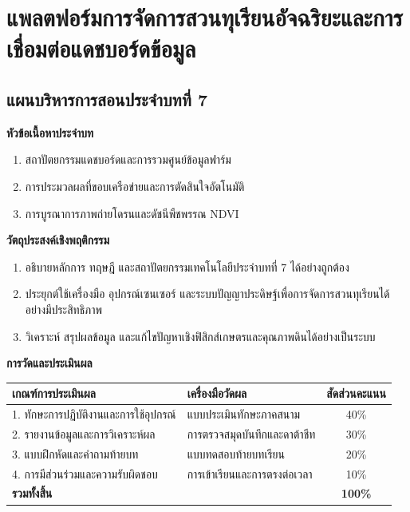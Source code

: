 \chapter{แพลตฟอร์มการจัดการสวนทุเรียนอัจฉริยะและการเชื่อมต่อแดชบอร์ดข้อมูล}
\label{chap:ch07}

\section*{แผนบริหารการสอนประจำบทที่ 7}

\noindent\textbf{หัวข้อเนื้อหาประจำบท}
\begin{enumerate}
    \item สถาปัตยกรรมแดชบอร์ดและการรวมศูนย์ข้อมูลฟาร์ม
    \item การประมวลผลที่ขอบเครือข่ายและการตัดสินใจอัตโนมัติ
    \item การบูรณาการภาพถ่ายโดรนและดัชนีพืชพรรณ NDVI
\end{enumerate}

\noindent\textbf{วัตถุประสงค์เชิงพฤติกรรม}
\begin{enumerate}
    \item อธิบายหลักการ ทฤษฎี และสถาปัตยกรรมเทคโนโลยีประจำบทที่ 7 ได้อย่างถูกต้อง
    \item ประยุกต์ใช้เครื่องมือ อุปกรณ์เซนเซอร์ และระบบปัญญาประดิษฐ์เพื่อการจัดการสวนทุเรียนได้อย่างมีประสิทธิภาพ
    \item วิเคราะห์ สรุปผลข้อมูล และแก้ไขปัญหาเชิงฟิสิกส์เกษตรและคุณภาพดินได้อย่างเป็นระบบ
\end{enumerate}

\noindent\textbf{การวัดและประเมินผล}
\begin{table}[H]
\centering\small
\begin{tabularx}{\textwidth}{p{} p{} c}
\toprule
\textbf{เกณฑ์การประเมินผล} & \textbf{เครื่องมือวัดผล} & \textbf{สัดส่วนคะแนน} \\
\midrule
1. ทักษะการปฏิบัติงานและการใช้อุปกรณ์ & แบบประเมินทักษะภาคสนาม & 40\% \\
2. รายงานข้อมูลและการวิเคราะห์ผล & การตรวจสมุดบันทึกและดาต้าชีท & 30\% \\
3. แบบฝึกหัดและคำถามท้ายบท & แบบทดสอบท้ายบทเรียน & 20\% \\
4. การมีส่วนร่วมและความรับผิดชอบ & การเข้าเรียนและการตรงต่อเวลา & 10\% \\
\midrule
\textbf{รวมทั้งสิ้น} & & \textbf{100\%} \\
\bottomrule
\end{tabularx}
\end{table}
\newpage

